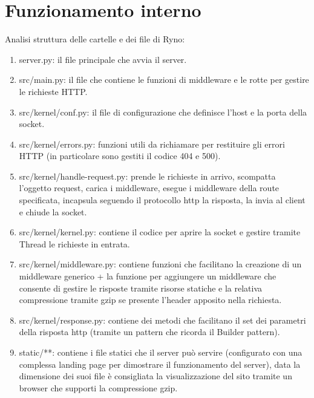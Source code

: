 \documentclass{article}
\begin{document}
\section{Funzionamento interno}
Analisi struttura delle cartelle e dei file di Ryno:
\begin{enumerate}
    \item server.py: il file principale che avvia il server.
    \item src/main.py: il file che contiene le funzioni di middleware e le rotte per gestire le richieste HTTP.
    \item src/kernel/conf.py: il file di configurazione che definisce l'host e la porta della socket.
    \item src/kernel/errors.py: funzioni utili da richiamare per restituire gli errori HTTP (in particolare sono gestiti il codice 404 e 500).
    \item src/kernel/handle-request.py: prende le richieste in arrivo, scompatta l'oggetto request, carica i middleware, esegue i middleware della route specificata, incapsula seguendo il protocollo http la risposta, la invia al client e chiude la socket.
    \item src/kernel/kernel.py: contiene il codice per aprire la socket e gestire tramite Thread le richieste in entrata.
    \item src/kernel/middleware.py: contiene funzioni che facilitano la creazione di un middleware generico + la funzione per aggiungere un middleware che consente di gestire le risposte tramite risorse statiche e la relativa compressione tramite gzip se presente l'header apposito nella richiesta.
    \item src/kernel/response.py: contiene dei metodi che facilitano il set dei parametri della risposta http (tramite un pattern che ricorda il Builder pattern).
    \item static/**: contiene i file statici che il server può servire (configurato con una complessa landing page per dimostrare il funzionamento del server), data la dimensione dei suoi file è consigliata la visualizzazione del sito tramite un browser che supporti la compressione gzip.
\end{enumerate}
\end{document}
